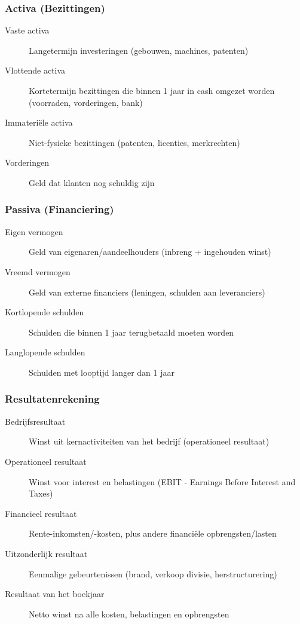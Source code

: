 \documentclass[a4paper,11pt]{article}
\begin{document}
\subsubsection{Activa (Bezittingen)}
\begin{description}
    \item[Vaste activa] Langetermijn investeringen (gebouwen, machines, patenten)
    \item[Vlottende activa] Kortetermijn bezittingen die binnen 1 jaar in cash omgezet worden (voorraden, vorderingen, bank)
    \item[Immateriële activa] Niet-fysieke bezittingen (patenten, licenties, merkrechten)
    \item[Vorderingen] Geld dat klanten nog schuldig zijn
\end{description}

\subsubsection{Passiva (Financiering)}
\begin{description}
    \item[Eigen vermogen] Geld van eigenaren/aandeelhouders (inbreng + ingehouden winst)
    \item[Vreemd vermogen] Geld van externe financiers (leningen, schulden aan leveranciers)
    \item[Kortlopende schulden] Schulden die binnen 1 jaar terugbetaald moeten worden
    \item[Langlopende schulden] Schulden met looptijd langer dan 1 jaar
\end{description}

\subsubsection{Resultatenrekening}
\begin{description}
    \item[Bedrijfsresultaat] Winst uit kernactiviteiten van het bedrijf (operationeel resultaat)
    \item[Operationeel resultaat] Winst voor interest en belastingen (EBIT - Earnings Before Interest and Taxes)
    \item[Financieel resultaat] Rente-inkomsten/-kosten, plus andere financiële opbrengsten/lasten
    \item[Uitzonderlijk resultaat] Eenmalige gebeurtenissen (brand, verkoop divisie, herstructurering)
    \item[Resultaat van het boekjaar] Netto winst na alle kosten, belastingen en opbrengsten
\end{description}
\end{document}
